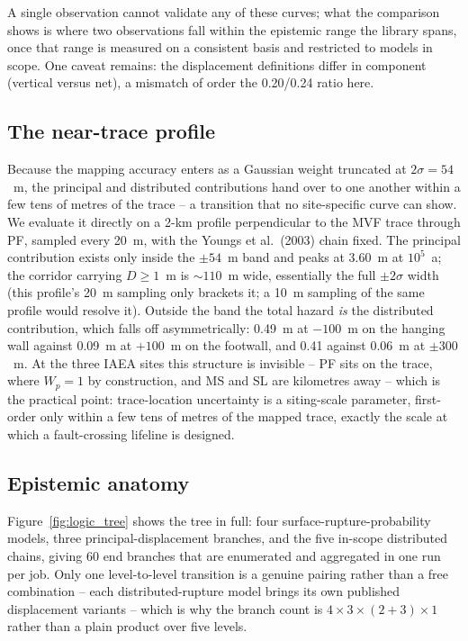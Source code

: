 A single observation cannot validate any of these curves; what the
comparison shows is where two observations fall within the epistemic
range the library spans, once that range is measured on a consistent
basis and restricted to models in scope. One caveat remains: the
displacement definitions differ in component (vertical versus net), a
mismatch of order the 0.20/0.24 ratio here.

\subsection{The near-trace profile}
\label{sec:application:profile}

Because the mapping accuracy enters as a Gaussian weight truncated at
$2\sigma = 54$~m, the principal and distributed contributions hand over
to one another within a few tens of metres of the trace -- a transition
that no site-specific curve can show. We evaluate it directly on a
2-km profile perpendicular to the MVF trace through PF, sampled every
20~m, with the Youngs et al.\ (2003) chain fixed. The principal contribution exists only inside the $\pm 54$~m
band and peaks at 3.60~m at $10^{5}$~a; the corridor carrying
$D \geq 1$~m is ${\sim}110$~m wide, essentially the full
$\pm 2\sigma$ width (this profile's 20~m sampling only brackets it;
a 10~m sampling of the same profile would resolve it). Outside the band the total hazard
\emph{is} the distributed contribution, which falls off
asymmetrically: 0.49~m at $-100$~m on the hanging wall against 0.09~m
at $+100$~m on the footwall, and 0.41 against 0.06~m at $\pm 300$~m.
At the three IAEA sites this structure is invisible -- PF sits on the
trace, where $W_p = 1$ by construction, and MS and SL are kilometres
away -- which is the practical point: trace-location uncertainty is a
siting-scale parameter, first-order only within a few tens of metres of
the mapped trace, exactly the scale at which a fault-crossing lifeline
is designed.

\subsection{Epistemic anatomy}
\label{sec:application:anatomy}

Figure~\ref{fig:logic_tree} shows the tree in full: four
surface-rupture-probability models, three principal-displacement
branches, and the five in-scope distributed chains, giving 60 end
branches that are enumerated and aggregated in one run per job. Only
one level-to-level transition is a genuine pairing rather than a free
combination -- each distributed-rupture model brings its own published
displacement variants -- which is why the branch count is
$4 \times 3 \times (2+3) \times 1$ rather than a plain product over
five levels.


